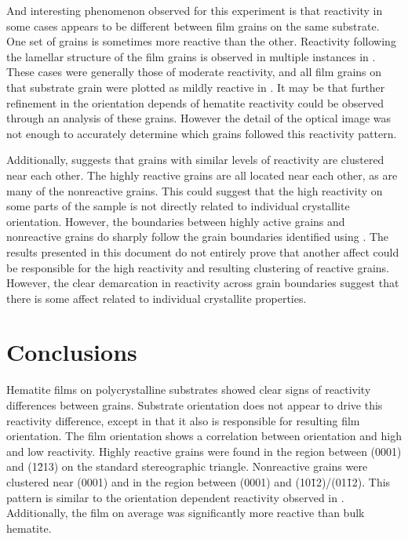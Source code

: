 And interesting phenomenon observed for this experiment is that reactivity in some cases appears to be different between film grains on the same substrate. One set of grains is sometimes more reactive than the other. Reactivity following the lamellar structure of the film grains is observed in multiple instances in . These cases were generally those of moderate reactivity, and all film grains on that substrate grain were plotted as mildly reactive in . It may be that further refinement in the orientation depends of hematite reactivity could be observed through an analysis of these grains. However the detail of the optical image was not enough to accurately determine which grains followed this reactivity pattern. 

Additionally,  suggests that grains with similar levels of reactivity are clustered near each other. The highly reactive grains are all located near each other, as are many of the nonreactive grains. This could suggest that the high reactivity on some parts of the sample is not directly related to individual crystallite orientation. However, the boundaries between highly active grains and nonreactive grains do sharply follow the grain boundaries identified using . The results presented in this document do not entirely prove that another affect could be responsible for the high reactivity and resulting clustering of reactive grains. However, the clear demarcation in reactivity across grain boundaries suggest that there is some affect related to individual crystallite properties.
 



\section{Conclusions}
\label{sec:poly.reac.conclusions}

Hematite films on polycrystalline substrates showed clear signs of reactivity differences between grains. Substrate orientation does not appear to drive this reactivity difference, except in that it also is responsible for resulting film orientation. The film orientation shows a correlation between orientation and high and low reactivity. Highly reactive grains were found in the region between (0001) and (1\={2}13) on the standard stereographic triangle. Nonreactive grains were clustered near (0001) and in the region between (0001) and (10\={1}2)/(01\={1}2). This pattern is similar to the orientation dependent reactivity observed in . Additionally, the film on average was significantly more reactive than bulk hematite. 
